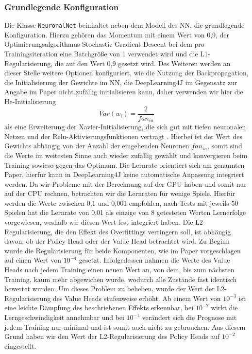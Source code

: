 \documentclass[12pt,a4paper]{article}
\begin{document}
\subsubsection{Grundlegende Konfiguration}
Die Klasse \texttt{NeuronalNet} beinhaltet neben dem Modell des NN, die grundlegende Konfiguration. Hierzu gehören das Momentum mit einem Wert von 0,9, der Optimierungsalgorithmus \glqq{}Stochastic Gradient Descent\grqq{} bei dem pro Trainingsiteration eine Batchgröße von 1 verwendet wird und die L1-Regularisierung, die auf den Wert 0,9 gesetzt wird. Des Weiteren werden an dieser Stelle weitere Optionen konfiguriert, wie die Nutzung der Backpropagation, die Initialisierung der Gewichte im NN, die DeepLearning4J im Gegensatz zur Angabe im Paper nicht zufällig initialisieren kann, daher verwenden wir hier die He-Initialisierung
\begin{equation}
Var(w_i) = \frac{2}{fan_{in}}
\end{equation}
als eine Erweiterung der Xavier-Initialisierung, die sich gut mit tiefen neuronalen Netzen und der Relu-Aktivierungsfunktionen verträgt \cite{Ghatak.2019}. Hierbei ist der Wert des Gewichts abhängig von der Anzahl der eingehenden Neuronen $fan_{in}$, somit sind die Werte im weitesten Sinne auch wieder zufällig gewählt und konvergieren beim Training sowieso gegen das Optimum. Die Lernrate orientiert sich am genannten Paper, hierfür kann in DeepLearning4J keine automatische Anpassung integriert werden. Da wir Probleme mit der Berechnung auf der GPU haben und somit nur auf der CPU rechnen, betrachten wir die Lernraten für wenige Spiele. Hierfür werden die Werte zwischen 0,1 und 0,001 empfohlen, nach Tests mit jeweils 50 Spielen hat die Lernrate von 0,01 als einzige von 8 getesteten Werten Lernerfolge vorgewiesen, weshalb wir diesen Wert fest integriert haben. Die L2-Regularisierung, die den Effekt des Overfittings verringern soll, ist abhängig davon, ob der Policy Head oder der Value Head betrachtet wird. Zu Beginn wurde die Regularisierung für beide Komponenten, wie im Paper vorgeschlagen auf einen Wert von $10^{-4}$ gesetzt. Infolgedessen nahmen die Werte des Value Heads nach jedem Training einen neuen Wert an, von dem, bis zum nächsten Training, kaum mehr abgewichen wurde, wodurch alle Zustände fast identisch bewertet wurden. Um dieses Problem zu beheben, wurde der Wert der L2-Regularisierung des Value Heads stufenweise erhöht. Ab einem Wert von $10^{-3}$ ist eine leichte Dämpfung des beschriebenen Effekts erkennbar, bei $10^{-2}$ wirkt die Lerngeschwindigkeit annehmbar und bei $10^{-1}$ verändert sich die Prognose mit jedem Training nur minimal und ist somit auch nicht zu gebrauchen. Aus diesem Grund haben wir den Wert der L2-Regularisierung des Policy Heads auf $10^{-2}$ eingestellt.\\
\end{document}
